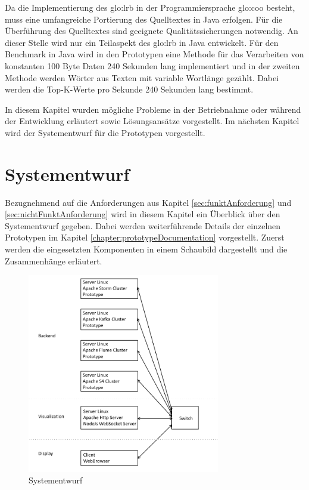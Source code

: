 Da die Implementierung des \gls{glo:lrb} in der Programmiersprache \gls{glo:coo} besteht, muss eine umfangreiche Portierung des Quelltextes in Java erfolgen. Für die Überführung des Quelltextes sind geeignete Qualitätssicherungen notwendig. An dieser Stelle wird nur ein Teilaspekt des \gls{glo:lrb} in Java entwickelt. Für den Benchmark in Java wird in den Prototypen eine Methode für das Verarbeiten von konstanten 100 Byte Daten 240 Sekunden lang implementiert und in der zweiten Methode werden Wörter aus Texten mit variable Wortlänge gezählt. Dabei werden die Top-K-Werte pro Sekunde 240 Sekunden lang bestimmt. 

In diesem Kapitel wurden mögliche Probleme in der Betriebnahme oder während der Entwicklung erläutert sowie Lösungsansätze vorgestellt. Im nächsten Kapitel wird der Systementwurf für die Prototypen vorgestellt.


\section{Systementwurf}
\label{sec:systementwurf}

Bezugnehmend auf die Anforderungen aus Kapitel \ref{sec:funktAnforderung} und \ref{sec:nichtFunktAnforderung} wird in diesem Kapitel ein Überblick über den Systementwurf gegeben. Dabei werden weiterführende Details der einzelnen Prototypen im Kapitel \ref{chapter:prototypeDocumentation} vorgestellt. Zuerst werden die eingesetzten Komponenten in einem Schaubild dargestellt und die Zusammenhänge erläutert.  

\begin{figure}[htb!]
\centering
\includegraphics[width=0.75\textwidth]{bilder/Systementwurf.png}
\caption{Systementwurf
\label{fig:systementwurf}}
\end{figure}

